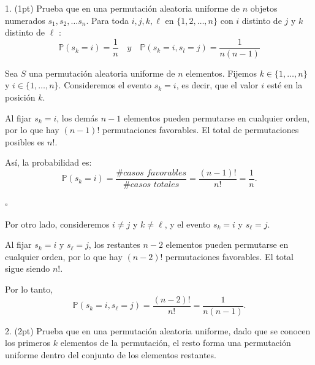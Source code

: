 1. (1pt) Prueba que en una permutación aleatoria uniforme de \( n \) objetos numerados \( s_{1}, s_{2}, \ldots s_{n} \). Para toda \( i, j, k, \ell \) en \( \{1,2, \ldots, n\} \) con \( i \) distinto de \( j \) y \( k \) distinto de \( \ell \) :
\[
\mathbb{P}\left(s_{k}=i\right)=\frac{1}{n} \quad y \quad \mathbb{P}\left(s_{k}=i, s_{l}=j\right)=\frac{1}{n(n-1)}
\]

Sea \( S \) una permutación aleatoria uniforme de \( n \) elementos. Fijemos \( k \in \{1, \ldots, n\} \) y \( i \in \{1, \ldots, n\} \). Consideremos el evento \( s_k = i \), es decir, que el valor \( i \) esté en la posición \( k \).

Al fijar \( s_k = i \), los demás \( n - 1 \) elementos pueden permutarse en cualquier orden, por lo que hay \((n-1)!\) permutaciones favorables.
El total de permutaciones posibles es \( n! \).

Así, la probabilidad es:
\[
\mathbb{P}(s_k = i) = \frac{\textit{\# casos favorables}}{\textit{\# casos totales}} = \frac{(n-1)!}{n!} = \frac{1}{n}.
\]

\hspace{11cm} $\square$

Por otro lado, consideremos \( i \neq j \) y \( k \neq \ell \), y el evento \( s_k = i \) y \( s_\ell = j \).

Al fijar \( s_k = i \) y \( s_\ell = j \), los restantes \( n - 2 \) elementos pueden permutarse en cualquier orden, por lo que hay \((n-2)!\) permutaciones favorables.
El total sigue siendo \( n! \).

Por lo tanto,
\[
\mathbb{P}(s_k = i, s_\ell = j) = \frac{(n-2)!}{n!} = \frac{1}{n(n-1)}.
\]

\QED

2. (2pt) Prueba que en una permutación aleatoria uniforme, dado que se conocen los primeros \( k \) elementos de la permutación, el resto forma una permutación uniforme dentro del conjunto de los elementos restantes.

